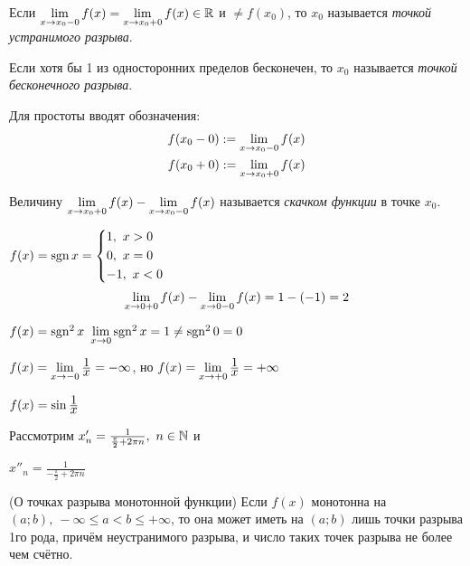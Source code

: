 \begin{definition}
	Если $\lim\limits_{x \to x_0-0} f(x) = \lim\limits_{x \to x_0+0} f(x) \in \mathbb{R}$ и $\neq f(x_0)$, то $x_0$ называется \textit{точкой устранимого разрыва}.
\end{definition}

\begin{definition}
	Если хотя бы 1 из односторонних пределов бесконечен, то $x_0$ называется \textit{точкой бесконечного разрыва}.
\end{definition}

\begin{note}
	Для простоты вводят обозначения:
	\begin{align*}
		f(x_0 - 0) := \lim\limits_{x \to x_0-0} f(x)
		\\
		f(x_0 + 0) := \lim\limits_{x \to x_0+0} f(x)
	\end{align*}
\end{note}

\begin{definition}
	Величину $\lim\limits_{x \to x_0+0} f(x) - \lim\limits_{x \to x_0-0} f(x)$ называется \textit{скачком функции} в точке $x_0$.
\end{definition}

\begin{example}
	$f(x) = \operatorname{sgn} x = \left\{\begin{aligned}&{1,\ x > 0} \\ &{0,\ x = 0} \\ &{-1,\ x < 0}\end{aligned}\right.$
	$$
		\lim\limits_{x \to 0+0} f(x) - \lim\limits_{x \to 0-0} f(x) = 1 - (- 1) = 2
	$$
\end{example}

\begin{example}
	$f(x) = \operatorname{sgn}^2 x\ \lim\limits_{x \to 0} \operatorname{sgn}^2 x = 1 \neq \operatorname{sgn}^2 0 = 0$
\end{example}

\begin{example}
	$f(x) = \lim\limits_{x \to -0} \frac{\displaystyle 1}{\displaystyle x} = -\infty$, но $f(x) = \lim\limits_{x \to +0} \frac{\displaystyle 1}{\displaystyle x} = +\infty$
\end{example}

\begin{example}
	$f(x) = \sin \frac{\displaystyle 1}{\displaystyle x}$
	
	Рассмотрим $x'_n = \frac{1}{\frac{\pi}{2} + 2\pi n},\ n \in \mathbb{N}$ и
	
	$x''_n = \frac{1}{-\frac{\pi}{2} + 2\pi n}$
	
\end{example}

\begin{theorem} (О точках разрыва монотонной функции)
	Если $f(x)$ монотонна на $(a; b),\ -\infty \le a < b \le +\infty$, то она может иметь на $(a; b)$ лишь точки разрыва 1го рода, причём неустранимого разрыва, и число таких точек разрыва не более чем счётно.
\end{theorem}

